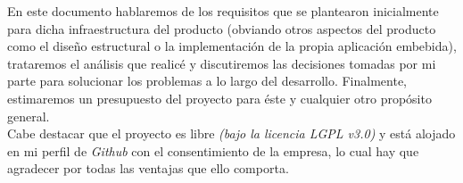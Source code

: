 En este documento hablaremos de los requisitos que se plantearon inicialmente para dicha infraestructura del producto (obviando otros aspectos del producto como el diseño estructural o la implementación de la propia aplicación embebida), trataremos el análisis que realicé y discutiremos las decisiones tomadas por mi parte para solucionar los problemas a lo largo del desarrollo. Finalmente, estimaremos un presupuesto del proyecto para éste y cualquier otro propósito general.\\

Cabe destacar que el proyecto es libre \textit{(bajo la licencia LGPL v3.0)} y está alojado en mi perfil de \textit{Github} \cite{github-adrian} con el consentimiento de la empresa, lo cual hay que agradecer por todas las ventajas que ello comporta.

\newpage